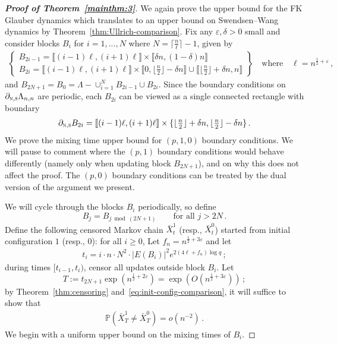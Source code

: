 \documentclass[reqno,11pt]{amsart}
\numberwithin{equation}{section}
\renewcommand{\epsilon}{\varepsilon}
\theoremstyle{definition}{
\newtheorem{example}[theorem]{Example}
\newtheorem{definition}[theorem]{Definition}
\newtheorem*{definition*}{Definition}
\newtheorem{problem}[theorem]{Problem}
\newtheorem{question}[theorem]{Question}
\newtheorem{remark}[theorem]{Remark}
}
\newcommand{\llb }{\llbracket}
\newcommand{\rrb }{\rrbracket}
\renewcommand{\epsilon}{\varepsilon}
\newcommand{\north}{{\textsc{n}}}
\newcommand{\south}{{\textsc{s}}}
\begin{document}
\begin{proof}[\textbf{\emph{Proof of Theorem~\ref{mainthm:3}}}]
We again prove the upper bound for the FK Glauber dynamics which translates to an upper bound on Swendsen--Wang dynamics by Theorem~\ref{thm:Ullrich-comparison}. Fix any $\epsilon,\delta>0$ small and consider blocks $B_i$ for $i=1,...,N$ where $N=\lceil \tfrac n \ell \rceil -1$, given by
\begin{align*}
\left\{
\begin{array}{l}
{B_{2i-1}  = \llb (i-1)\ell, (i+1)\ell\rrb \times\llb \delta n, (1-\delta) n\rrb} \\
{B_{2i}= \llb (i-1) \ell, (i+1)\ell\rrb \times \llb 0,\lfloor \frac n2\rfloor- \delta n  \rrb \cup \llb \lfloor \frac n2\rfloor +\delta n, n\rrb}
\end{array}
\right\}
\quad \mbox{where} \quad \ell= n^{\frac 12 +\epsilon}\,,
\end{align*}
and $B_{2N+1}=B_0= \Lambda - \cup _{i=1}^{N} B_{2i-1}\cup B_{2i}$. Since the boundary conditions on $\partial_{\north,\south}\Lambda_{n,n}$ are periodic, each $B_{2i}$ can be viewed as a single connected rectangle with boundary 
\begin{align*}
\partial_{\north,\south} B_{2i}= \llb (i-1)\ell,(i+1)\ell\rrb \times\{ \lfloor\tfrac n2\rfloor+ \delta n,\lfloor \tfrac n2\rfloor-\delta n\}\,.
\end{align*}
We prove the mixing time upper bound for $(p,1,0)$ boundary conditions.  We will pause to comment where the $(p,1)$ boundary conditions would behave differently (namely only when updating block $B_{2N+1}$), and on why this does not affect the proof. The $(p,0)$ boundary conditions can be treated by the dual version of the argument we present.

We will cycle through the blocks $B_i$ periodically, so define $$B_j = B_{j \bmod (2N+1)}\qquad \mbox{for all $j>2N$}\,.$$
Define the following censored Markov chain $\bar X_t^{1}$ (resp., $\bar X_t^0$) started from initial configuration $1$ (resp., $0$): for all $i\geq 0$,
Let $f_n = n^{\frac 12 +3\epsilon}$ and let
\begin{align*}
t_i  =i \cdot n \cdot N^2 \cdot |E(B_i)|^2 e^{2(4\ell+ f_n) \log q}\,;
\end{align*}  
during times $[t_{i-1},t_{i})$, censor all updates outside block $B_{i}$.
Let 
\begin{equation}\label{eq-T-def}T:= t_{2N+1} \exp( n^{\frac 12+2\epsilon})=\exp(O(n^{\frac 12 +3\epsilon}))\,;
\end{equation}
 by Theorem~\ref{thm:censoring} and~\eqref{eq:init-config-comparison}, it will suffice to show that
\begin{align*}
\mathbb P(\bar X_{T}^1 \neq \bar X_{T}^0 ) = o(n^{-2})\,.
\end{align*}
We begin with a uniform upper bound on the mixing times of $B_i$. 


\end{proof}
\end{document}
